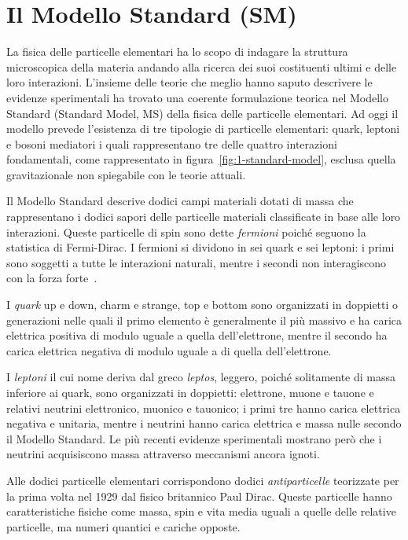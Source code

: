 \section{Il Modello Standard (SM)}
\label{sec:SM}
    La fisica delle particelle elementari ha lo scopo di indagare la struttura microscopica della materia andando alla ricerca dei suoi costituenti ultimi e delle loro interazioni. L'insieme delle teorie che meglio hanno saputo descrivere le evidenze sperimentali ha trovato una coerente formulazione teorica nel Modello Standard (Standard Model, MS) della fisica delle particelle elementari. Ad oggi il modello prevede l'esistenza di tre tipologie di particelle elementari: quark, leptoni e bosoni mediatori i quali rappresentano tre delle quattro interazioni fondamentali, come rappresentato in figura~\ref{fig:1-standard-model}, esclusa quella gravitazionale non spiegabile con le teorie attuali.
    
    Il Modello Standard descrive dodici campi materiali dotati di massa che rappresentano i dodici sapori delle particelle materiali classificate in base alle loro interazioni. Queste particelle di spin  sono dette \textit{fermioni} poiché seguono la statistica di Fermi-Dirac. I fermioni si dividono in sei quark e sei leptoni: i primi sono soggetti a tutte le interazioni naturali, mentre i secondi non interagiscono con la forza forte~\cite{CG_2007}.
    
    I \textit{quark} up e down, charm e strange, top e bottom sono organizzati in doppietti o generazioni nelle quali il primo elemento è generalmente il più massivo e ha carica elettrica positiva di modulo uguale a  quella dell'elettrone, mentre il secondo ha carica elettrica negativa di modulo uguale a  di quella dell'elettrone.

    I \textit{leptoni} il cui nome deriva dal greco \textit{leptos}, leggero, poiché solitamente di massa inferiore ai quark, sono organizzati in doppietti: elettrone, muone e tauone e relativi neutrini elettronico, muonico e tauonico; i primi tre hanno carica elettrica negativa e unitaria, mentre i neutrini hanno carica elettrica e massa nulle secondo il Modello Standard. Le più recenti evidenze sperimentali mostrano però che i neutrini acquisiscono massa attraverso meccanismi ancora ignoti.

    Alle dodici particelle elementari corrispondono dodici \textit{antiparticelle} teorizzate per la prima volta nel 1929 dal fisico britannico Paul Dirac. Queste particelle hanno caratteristiche fisiche come massa, spin e vita media uguali a quelle delle relative particelle, ma numeri quantici e cariche opposte.


